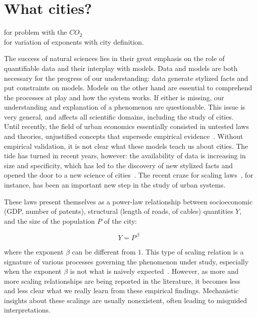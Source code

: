 \section{What cities?}
\label{sec:what_cities_}

\cite{Louf:2014_smog} for problem with the $CO_2$\\
\cite{Arcaute:2015} for variation of exponents with city definition.


The success of natural sciences lies in their great emphasis on the role of quantifiable data and their interplay with models. Data and models are both necessary for the progress of our understanding: data generate stylized facts and put constraints on models. Models on the other hand are essential to comprehend the processes at play and how the system works. If either is missing, our understanding and explanation of a phenomenon are questionable. This
issue is very general, and affects all scientific domains, including the study of cities. \\

Until recently, the field of urban economics essentially consisted in untested laws and theories, unjustified concepts that supersede empirical evidence~\cite{Bouchaud:2008}. Without empirical validation, it is not clear what these models teach us about cities. The tide has turned in recent years, however: the availability of data is increasing in size and specificity, which has led to the discovery of new stylized facts and opened the door to a new science of cities~\cite{Batty:2013}. The recent craze for scaling laws~\cite{Batty:2008,Bettencourt:2007,Pumain:2004}, for instance, has been an important new step in the study of urban systems.

These laws present themselves as a power-law relationship between socioeconomic (GDP, number of patents), structural (length of roads, of cables) quantities $Y$, and the size of the population $P$ of the city:

\begin{equation}
Y = P^{\, \beta}
\end{equation}


where the exponent $\beta$ can be different from $1$. This type of scaling relation is a signature
of various processes governing the phenomenon under study, especially when the exponent
$\beta$ is not what is naively expected~\cite{Barenblatt:2003}. However, as more and more scaling
relationships are being reported in the literature, it becomes less and less clear what we really
learn from these empirical findings. Mechanistic insights about these scalings are usually
nonexistent, often leading to misguided interpretations.\\

